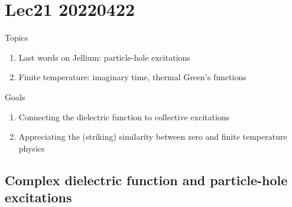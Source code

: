 \chapter{Lec21 20220422}

Topics

\begin{enumerate}
    \item Last words on Jellium: particle-hole excitations
    \item Finite temperature: imaginary time, thermal Green's functions
\end{enumerate}

Goals

\begin{enumerate}
    \item Connecting the dielectric function to collective excitations
    \item Appreciating the (striking) similarity between zero and finite temperature physics
\end{enumerate}

\section{Complex dielectric function and particle-hole excitations}

